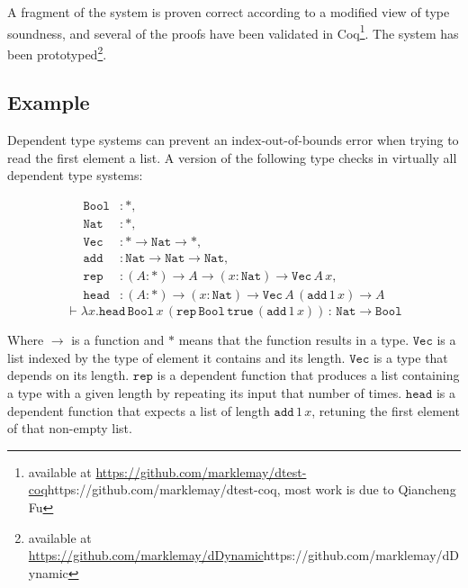 A fragment of the system is proven correct according to a modified view of type soundness, and several of the proofs have been validated in Coq\footnote{
available at \url{https://github.com/marklemay/dtest-coq}{https://github.com/marklemay/dtest-coq}, most work is due to Qiancheng Fu}.
The system has been prototyped\footnote{available at \url{https://github.com/marklemay/dDynamic}{https://github.com/marklemay/dDynamic}}.


\subsection{Example}

Dependent type systems can prevent an index-out-of-bounds error when trying to read the first element a list.
A version of the following type checks in virtually all dependent type systems:


\begin{align*}
\mathtt{Bool} & :*,\\
\mathtt{Nat} & :*,\\
\mathtt{Vec} & :*\rightarrow\mathtt{Nat}\rightarrow*,\\
\mathtt{add} & :\mathtt{Nat}\rightarrow\mathtt{Nat}\rightarrow\mathtt{Nat},\\
\mathtt{rep} & :\left(A:*\right)\rightarrow A\rightarrow\left(x:\mathtt{Nat}\right)\rightarrow\mathtt{Vec\,}A\,x,\\
\mathtt{head} & :\left(A:*\right)\rightarrow\left(x:\mathtt{Nat}\right)\rightarrow\mathtt{Vec}\,A\,\left(\mathtt{add}\,1\,x\right)\rightarrow A
\end{align*}
\[
\vdash\lambda x.\mathtt{head}\,\mathtt{Bool}\,x\,\left(\mathtt{rep}\,\mathtt{Bool}\,\mathtt{true}\,\left(\mathtt{add}\,1\,x\right)\right)\,:\,\mathtt{Nat}\rightarrow\mathtt{Bool}
\]


Where $\rightarrow$ is a function and $*$ means that the function results in a type.
$\mathtt{Vec}$ is a list indexed by the type of element it contains and its length.
$\mathtt{Vec}$ is a type that depends on its length.
$\mathtt{rep}$ is a dependent function that produces a list containing a type with a given length by repeating its input that number of times.
$\mathtt{head}$ is a dependent function that expects a list of length $\mathtt{add}\,1\,x$, retuning the first element of that non-empty list. 

